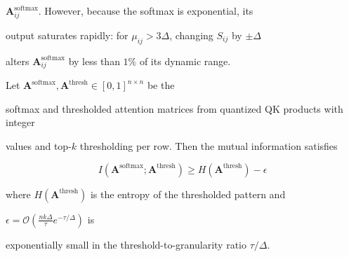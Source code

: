 $\mathbf{A}^{\text{softmax}}_{ij}$. However, because the softmax is exponential, its






output saturates rapidly: for $\mu_{ij} > 3\Delta$, changing $S_{ij}$ by $\pm\Delta$






alters $\mathbf{A}^{\text{softmax}}_{ij}$ by less than $1\%$ of its dynamic range.













\begin{theorem}






Let $\mathbf{A}^{\text{softmax}}, \mathbf{A}^{\text{thresh}} \in [0,1]^{n \times n}$ be the






softmax and thresholded attention matrices from quantized QK products with integer






values and top-$k$ thresholding per row. Then the mutual information satisfies






$$






I(\mathbf{A}^{\text{softmax}}; \mathbf{A}^{\text{thresh}}) \geq H(\mathbf{A}^{\text{thresh}}) - \epsilon






$$






where $H(\mathbf{A}^{\text{thresh}})$ is the entropy of the thresholded pattern and






$\epsilon = \mathcal{O}\left( \frac{n k \Delta}{\tau} e^{-\tau / \Delta} \right)$ is






exponentially small in the threshold-to-granularity ratio $\tau / \Delta$.






\end{theorem}













